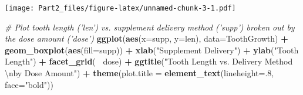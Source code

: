 \documentclass[
]{article}
\newenvironment{Shaded}{\begin{snugshade}}{\end{snugshade}}
\newcommand{\CharTok}[1]{\textcolor[rgb]{0.31,0.60,0.02}{#1}}
\newcommand{\CommentTok}[1]{\textcolor[rgb]{0.56,0.35,0.01}{\textit{#1}}}
\newcommand{\DataTypeTok}[1]{\textcolor[rgb]{0.13,0.29,0.53}{#1}}
\newcommand{\DecValTok}[1]{\textcolor[rgb]{0.00,0.00,0.81}{#1}}
\newcommand{\KeywordTok}[1]{\textcolor[rgb]{0.13,0.29,0.53}{\textbf{#1}}}
\newcommand{\NormalTok}[1]{#1}
\newcommand{\OperatorTok}[1]{\textcolor[rgb]{0.81,0.36,0.00}{\textbf{#1}}}
\newcommand{\StringTok}[1]{\textcolor[rgb]{0.31,0.60,0.02}{#1}}
\begin{document}
\begin{Shaded}
\end{Shaded}

\texttt{[image: Part2\_files/figure-latex/unnamed-chunk-3-1.pdf]}

\begin{Shaded}
\begin{Highlighting}[]
\CommentTok{# Plot tooth length ('len') vs. supplement delivery method ('supp') broken out by the dose amount ('dose')}
\KeywordTok{ggplot}\NormalTok{(}\KeywordTok{aes}\NormalTok{(}\DataTypeTok{x=}\NormalTok{supp, }\DataTypeTok{y=}\NormalTok{len), }\DataTypeTok{data=}\NormalTok{ToothGrowth) }\OperatorTok{+}\StringTok{ }\KeywordTok{geom_boxplot}\NormalTok{(}\KeywordTok{aes}\NormalTok{(}\DataTypeTok{fill=}\NormalTok{supp)) }\OperatorTok{+}\StringTok{ }\KeywordTok{xlab}\NormalTok{(}\StringTok{"Supplement Delivery"}\NormalTok{) }\OperatorTok{+}\StringTok{ }\KeywordTok{ylab}\NormalTok{(}\StringTok{"Tooth Length"}\NormalTok{) }\OperatorTok{+}\StringTok{ }\KeywordTok{facet_grid}\NormalTok{(}\OperatorTok{~}\StringTok{ }\NormalTok{dose) }\OperatorTok{+}\StringTok{ }\KeywordTok{ggtitle}\NormalTok{(}\StringTok{"Tooth Length vs. Delivery Method }\CharTok{\textbackslash{}n}\StringTok{by Dose Amount"}\NormalTok{) }\OperatorTok{+}\StringTok{ }
\StringTok{     }\KeywordTok{theme}\NormalTok{(}\DataTypeTok{plot.title =} \KeywordTok{element_text}\NormalTok{(}\DataTypeTok{lineheight=}\NormalTok{.}\DecValTok{8}\NormalTok{, }\DataTypeTok{face=}\StringTok{"bold"}\NormalTok{))}
\end{Highlighting}
\end{Shaded}
\end{document}
